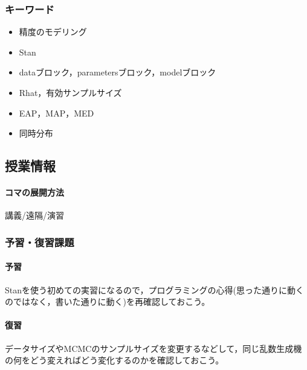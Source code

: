 \subsubsection{キーワード}
\begin{itemize}
	\item 精度のモデリング
	\item Stan
	\item dataブロック，parametersブロック，modelブロック
	\item Rhat，有効サンプルサイズ
	\item EAP，MAP，MED
	\item 同時分布
\end{itemize}
\subsection{授業情報}
\paragraph{コマの展開方法}
講義/遠隔/演習
\subsubsection{予習・復習課題}
\paragraph{予習}Stanを使う初めての実習になるので，プログラミングの心得(思った通りに動くのではなく，書いた通りに動く)を再確認しておこう。
\paragraph{復習}データサイズやMCMCのサンプルサイズを変更するなどして，同じ乱数生成機の何をどう変えればどう変化するのかを確認しておこう。